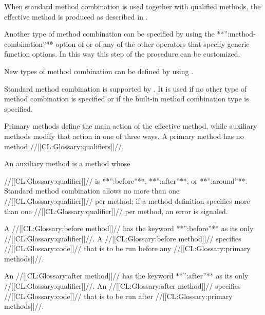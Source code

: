 When standard method combination is used together with qualified methods, 
the effective method is produced as described in \secref\StdMethComb.
                                                                  
Another type of method combination can be specified by using the
**'':method-combination''** option of  or
of any of the other operators that specify generic function options.  In
this way this step of the procedure can be customized.

New types of method combination can be defined by using 
. 

\endsubsubsubsection%

\endsubsubsection%

                                                       

Standard method combination is supported by .
It is used if no other type of method
combination is specified or if the built-in method combination type
 is specified. 

Primary methods define the main action of the effective method,  
while auxiliary methods modify that action in one of three ways.
A primary method has no method //[[CL:Glossary:qualifiers]]//.
                                                           
An auxiliary method is a method whose 

//[[CL:Glossary:qualifier]]// is **'':before''**, **'':after''**, or **'':around''**.
Standard method combination
allows no more than one //[[CL:Glossary:qualifier]]// per method; if a method definition
specifies more than one //[[CL:Glossary:qualifier]]// per method, an error is signaled.

\beginlist

\itemitem{\bull}
A //[[CL:Glossary:before method]]// has the keyword **'':before''** as its only //[[CL:Glossary:qualifier]]//.
A //[[CL:Glossary:before method]]// specifies //[[CL:Glossary:code]]// that is to be run before any 
//[[CL:Glossary:primary methods]]//.

\itemitem{\bull}
An //[[CL:Glossary:after method]]// has the keyword **'':after''** as its only //[[CL:Glossary:qualifier]]//.
An //[[CL:Glossary:after method]]// specifies //[[CL:Glossary:code]]// that is to be run after
//[[CL:Glossary:primary methods]]//.

